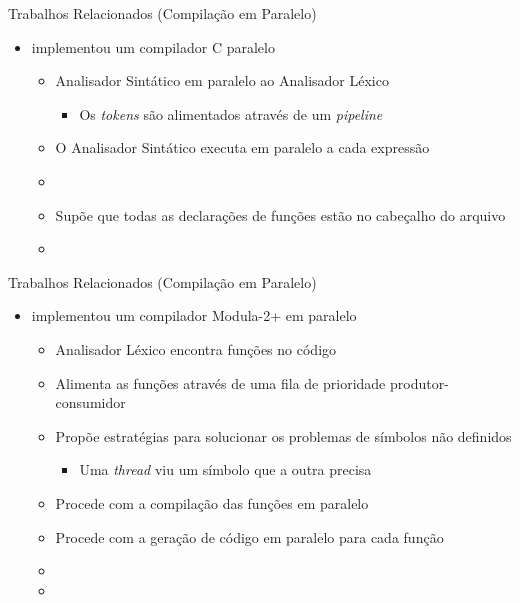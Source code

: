 \begin{frame}{Trabalhos Relacionados (Compilação em Paralelo)}
    \begin{itemize}
        \item \cite{vandevoorde1988parallel} implementou um compilador C paralelo
            \begin{itemize}
                \item Analisador Sintático em paralelo ao Analisador Léxico
                    \begin{itemize}
                        \item Os \textit{tokens} são alimentados através de um \textit{pipeline}
                    \end{itemize}
                \item O Analisador Sintático executa em paralelo a cada expressão
                \item[]
                \item Supõe que todas as declarações de funções estão no cabeçalho do arquivo
                \item {\color{red}{Não discute otimização}}
            \end{itemize}
    \end{itemize}
\end{frame}

\begin{frame}{Trabalhos Relacionados (Compilação em Paralelo)}
    \begin{itemize}
        \item \cite{wortman1992} implementou um compilador Modula-2+ em paralelo
            \begin{itemize}
                \item Analisador Léxico encontra funções no código
                \item Alimenta as funções através de uma fila de prioridade produtor-consumidor
                \item Propõe estratégias para solucionar os problemas de símbolos não definidos
                    \begin{itemize}
                        \item Uma \textit{thread} viu um símbolo que a outra precisa
                    \end{itemize}
                \item Procede com a compilação das funções em paralelo
                \item Procede com a geração de código em paralelo para cada função
                \item[]
                \item {\color{red}{Não discute otimização}}
            \end{itemize}
    \end{itemize}
\end{frame}

